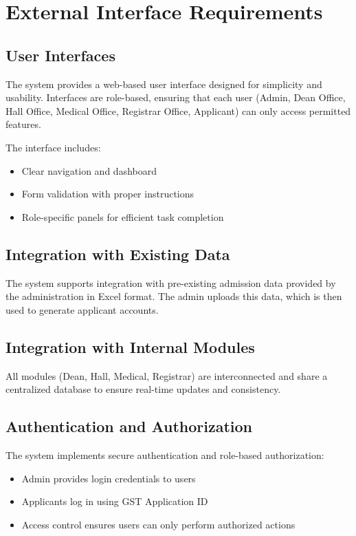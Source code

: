 \section{External Interface Requirements}

\subsection{User Interfaces}
The system provides a web-based user interface designed for simplicity and usability. Interfaces are role-based, ensuring that each user (Admin, Dean Office, Hall Office, Medical Office, Registrar Office, Applicant) can only access permitted features.

The interface includes:
\begin{itemize}
    \item Clear navigation and dashboard
    \item Form validation with proper instructions
    \item Role-specific panels for efficient task completion
\end{itemize}

\subsection{Integration with Existing Data}
The system supports integration with pre-existing admission data provided by the administration in Excel format. The admin uploads this data, which is then used to generate applicant accounts.

\subsection{Integration with Internal Modules}
All modules (Dean, Hall, Medical, Registrar) are interconnected and share a centralized database to ensure real-time updates and consistency.

\subsection{Authentication and Authorization}
The system implements secure authentication and role-based authorization:
\begin{itemize}
    \item Admin provides login credentials to users
    \item Applicants log in using GST Application ID
    \item Access control ensures users can only perform authorized actions
\end{itemize}